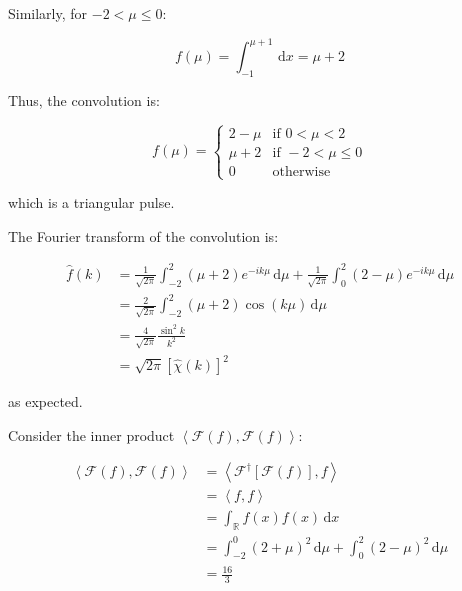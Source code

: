 \documentclass[12pt]{article}
\begin{document}
Similarly, for $-2 < \mu \le 0$:

\begin{equation}
    f(\mu) = \int_{-1}^{\mu + 1} \, \mathrm{d}x = \mu + 2
\end{equation}

Thus, the convolution is:

\begin{equation}
    f(\mu) =
    \begin{cases}
        2 - \mu & \text{if } 0 < \mu < 2 \\
        \mu + 2 & \text{if } -2 < \mu \le 0 \\
        0 & \text{otherwise}
    \end{cases}
\end{equation}

which is a triangular pulse.

The Fourier transform of the convolution is:

\begin{equation}
\begin{split}
    \hat{f}(k) &= \frac{1}{\sqrt{2\pi}} \int_{-2}^{2} (\mu + 2) e^{-ik\mu} \, \mathrm{d}\mu + \frac{1}{\sqrt{2\pi}} \int_{0}^{2} (2 - \mu) e^{-ik\mu} \, \mathrm{d}\mu \\
    &= \frac{2}{\sqrt{2\pi}} \int_{-2}^{2} (\mu + 2) \cos{(k\mu)} \, \mathrm{d}\mu \\
    &= \frac{4}{\sqrt{2\pi}} \frac{\sin^{2}{k}}{k^{2}} \\
    &= \sqrt{2\pi} \left[ \hat{\chi}(k) \right]^{2}
\end{split}
\end{equation}

as expected.

Consider the inner product $\left\langle \mathcal{F}(f), \mathcal{F}(f) \right\rangle$:

\begin{equation}
\begin{split}
    \left\langle \mathcal{F}(f), \mathcal{F}(f) \right\rangle &= \left\langle \mathcal{F}^{\dagger}[\mathcal{F}(f)], f \right\rangle \\
    &= \left\langle f, f \right\rangle \\
    &= \int_{\mathbb{R}} f(x) f(x) \, \mathrm{d}x \\
    &= \int_{-2}^{0} (2 + \mu)^{2} \, \mathrm{d}\mu + \int_{0}^{2} (2 - \mu)^{2} \, \mathrm{d}\mu \\
    &= \frac{16}{3}
\end{split}
\end{equation}
\end{document}
